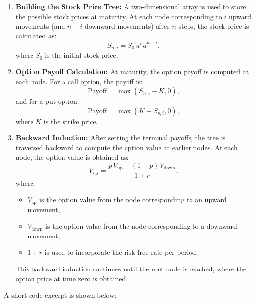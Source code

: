 \documentclass{article}
\begin{document}
    \begin{enumerate}

        \item \textbf{Building the Stock Price Tree:} A two-dimensional array is used to store the possible stock prices at maturity. At each node corresponding to \( i \) upward movements (and \( n-i \) downward movements) after \( n \) steps, the stock price is calculated as:
        \[
        S_{n,i} = S_0 \, u^i \, d^{n-i},
        \]
        where \( S_0 \) is the initial stock price.

        \item \textbf{Option Payoff Calculation:} At maturity, the option payoff is computed at each node. For a call option, the payoff is:
        \[
        \text{Payoff} = \max(S_{n,i} - K, 0),
        \]
        and for a put option:
        \[
        \text{Payoff} = \max(K - S_{n,i}, 0),
        \]
        where \( K \) is the strike price.

        \item \textbf{Backward Induction:} After setting the terminal payoffs, the tree is traversed backward to compute the option value at earlier nodes. At each node, the option value is obtained as:
        \[
        V_{i,j} = \frac{p \, V_{\text{up}} + (1 - p) \, V_{\text{down}}}{1 + r},
        \]
        where:
        \begin{itemize}
            \item \( V_{\text{up}} \) is the option value from the node corresponding to an upward movement,
            \item \( V_{\text{down}} \) is the option value from the node corresponding to a downward movement,
            \item \( 1 + r \) is used to incorporate the risk-free rate per period.
        \end{itemize}
        This backward induction continues until the root node is reached, where the option price at time zero is obtained.
    \end{enumerate}


    A short code excerpt is shown below:
\end{document}
